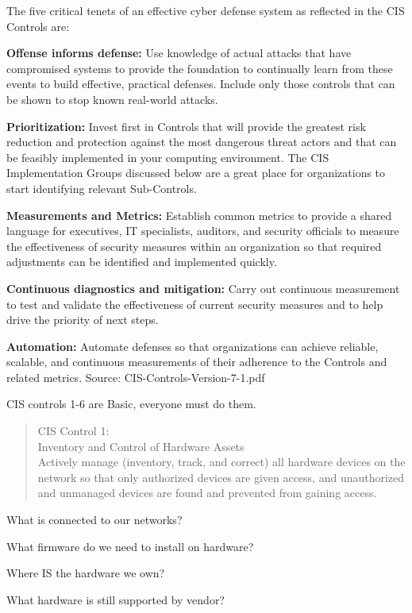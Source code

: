 \documentclass[Screen16to9,17pt]{foils}
\begin{document}
\begin{list2}
\item
The five critical tenets of an effective cyber defense system as reflected
in the CIS Controls are:
\item {\bf Offense informs defense:} Use knowledge of actual attacks that have
compromised systems to provide the foundation to continually learn
from these events to build effective, practical defenses. Include only
those controls that can be shown to stop known real-world attacks.
\item {\bf Prioritization:} Invest first in Controls that will provide the greatest risk
reduction and protection against the most dangerous threat actors
and that can be feasibly implemented in your computing environment.
The CIS Implementation Groups discussed below are a great place for
organizations to start identifying relevant Sub-Controls.
\item {\bf Measurements and Metrics:} Establish common metrics to provide a
shared language for executives, IT specialists, auditors, and security
officials to measure the effectiveness of security measures within
an organization so that required adjustments can be identified and
implemented quickly.
\item {\bf Continuous diagnostics and mitigation:} Carry out continuous
measurement to test and validate the effectiveness of current security
measures and to help drive the priority of next steps.
\item {\bf Automation:} Automate defenses so that organizations can achieve
reliable, scalable, and continuous measurements of their adherence to
the Controls and related metrics. \hskip 2cm Source: CIS-Controls-Version-7-1.pdf
\end{list2}



CIS controls 1-6 are Basic, everyone must do them.


\begin{quote}
CIS Control 1:\\
Inventory and Control of Hardware Assets\\
Actively manage (inventory, track, and correct) all hardware devices on the network so that only authorized devices are given access, and unauthorized and unmanaged devices are found and prevented from gaining access.
\end{quote}

\begin{list1}
\item What is connected to our networks?
\item What firmware do we need to install on hardware?
\item Where IS the hardware we own?
\item What hardware is still supported by vendor?
\end{list1}
\end{document}
